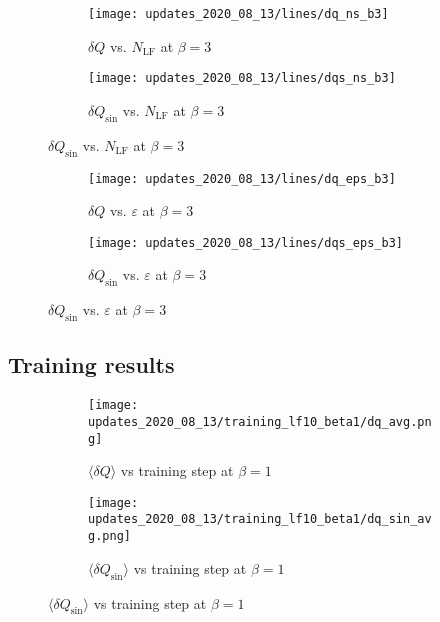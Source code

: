 \clearpage
\begin{figure}[h!]
  \centering
  \begin{subfigure}[htpb]{0.4725\textwidth}
    \texttt{[image: updates\_2020\_08\_13/lines/dq\_ns\_b3]}
    \caption{\(\delta Q\) vs. \(N_{\mathrm{LF}}\) at \(\beta = 3\)}%
  \end{subfigure}
  \begin{subfigure}[htpb]{0.4725\textwidth}
    \texttt{[image: updates\_2020\_08\_13/lines/dqs\_ns\_b3]}
    \caption{\(\delta Q_{\sin}\) vs. \(N_{\mathrm{LF}}\) at \(\beta = 3\)}%
  \end{subfigure}
\end{figure}
%
\begin{figure}[h!]
  \centering
  \begin{subfigure}[htpb]{0.4725\textwidth}
    \texttt{[image: updates\_2020\_08\_13/lines/dq\_eps\_b3]}
    \caption{\(\delta Q\) vs. \(\varepsilon\) at \(\beta = 3\)}%
  \end{subfigure}
  \begin{subfigure}[htpb]{0.4725\textwidth}
    \texttt{[image: updates\_2020\_08\_13/lines/dqs\_eps\_b3]}
    \caption{\(\delta Q_{\sin}\) vs. \(\varepsilon\) at \(\beta = 3\)}%
  \end{subfigure}
\end{figure}

\clearpage
\subsection{Training results}%
\label{subsec:2020_08_13_training_results}
\begin{figure}[htpb]
  \centering
  \begin{subfigure}[htpb]{0.375\textwidth}
    \texttt{[image: updates\_2020\_08\_13/training\_lf10\_beta1/dq\_avg.png]}
    \caption{\(\langle\delta Q\rangle\) vs training step at \(\beta = 1\)}%
  \end{subfigure}
  \hfill
  \begin{subfigure}[htpb]{0.375\textwidth}
    \texttt{[image: updates\_2020\_08\_13/training\_lf10\_beta1/dq\_sin\_avg.png]}
    \caption{\(\langle\delta Q_{\sin}\rangle\) vs training step at \(\beta = 1\)}%
  \end{subfigure}
\end{figure}

